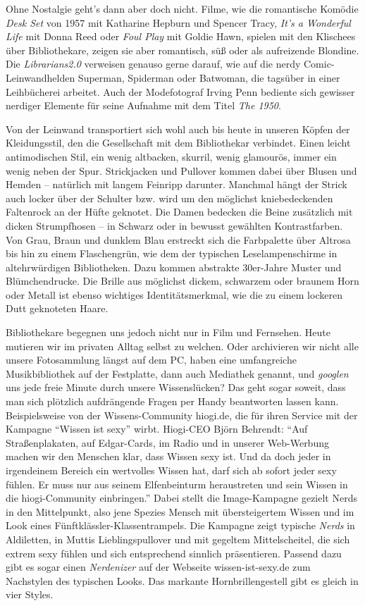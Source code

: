 \documentclass[output=paper]{langscibook}
\begin{document}
Ohne Nostalgie geht's dann aber doch nicht. Filme, wie die romantische
Komödie \emph{Desk Set} von 1957 mit Katharine Hepburn und Spencer
Tracy, \emph{It's a Wonderful Life} mit Donna Reed oder \emph{Foul Play}
mit Goldie Hawn, spielen mit den Klischees über Bibliothekare, zeigen
sie aber romantisch, süß oder als aufreizende Blondine. Die
\emph{Librarians2.0} verweisen genauso gerne darauf, wie auf die nerdy
Comic-Leinwandhelden Superman, Spiderman oder Batwoman, die tagsüber in
einer Leihbücherei arbeitet. Auch der Modefotograf Irving Penn bediente
sich gewisser nerdiger Elemente für seine Aufnahme mit dem Titel
\emph{The 1950}.

Von der Leinwand transportiert sich wohl auch bis heute in unseren
Köpfen der Kleidungsstil, den die Gesellschaft mit dem Bibliothekar
verbindet. Einen leicht antimodischen Stil, ein wenig altbacken,
skurril, wenig glamourös, immer ein wenig neben der Spur. Strickjacken
und Pullover kommen dabei über Blusen und Hemden -- natürlich mit langem
Feinripp darunter. Manchmal hängt der Strick auch locker über der
Schulter bzw. wird um den möglichst kniebedeckenden Faltenrock an der
Hüfte geknotet. Die Damen bedecken die Beine zusätzlich mit dicken
Strumpfhosen -- in Schwarz oder in bewusst gewählten Kontrastfarben. Von
Grau, Braun und dunklem Blau erstreckt sich die Farbpalette über Altrosa
bis hin zu einem Flaschengrün, wie dem der typischen Leselampenschirme
in altehrwürdigen Bibliotheken. Dazu kommen abstrakte 30er-Jahre Muster
und Blümchendrucke. Die Brille aus möglichst dickem, schwarzem oder
braunem Horn oder Metall ist ebenso wichtiges Identitätsmerkmal, wie die
zu einem lockeren Dutt geknoteten Haare.

Bibliothekare begegnen uns jedoch nicht nur in Film und Fernsehen. Heute
mutieren wir im privaten Alltag selbst zu welchen. Oder archivieren wir
nicht alle unsere Fotosammlung längst auf dem PC, haben eine
umfangreiche Musikbibliothek auf der Festplatte, dann auch Mediathek
genannt, und \emph{googlen} uns jede freie Minute durch unsere
Wissenslücken? Das geht sogar soweit, dass man sich plötzlich
aufdrängende Fragen per Handy beantworten lassen kann. Beispielsweise
von der Wissens-Community hiogi.de, die für ihren Service mit der
Kampagne ``Wissen ist sexy'' wirbt. Hiogi-CEO Björn Behrendt: ``Auf
Straßenplakaten, auf Edgar-Cards, im Radio und in unserer Web-Werbung
machen wir den Menschen klar, dass Wissen sexy ist. Und da doch jeder in
irgendeinem Bereich ein wertvolles Wissen hat, darf sich ab sofort jeder
sexy fühlen. Er muss nur aus seinem Elfenbeinturm heraustreten und sein
Wissen in die hiogi-Community einbringen.'' Dabei stellt die
Image-Kampagne gezielt Nerds in den Mittelpunkt, also jene Spezies
Mensch mit übersteigertem Wissen und im Look eines
Fünftklässler-Klassentrampels. Die Kampagne zeigt typische \emph{Nerds}
in Aldiletten, in Muttis Lieblingspullover und mit gegeltem
Mittelscheitel, die sich extrem sexy fühlen und sich entsprechend
sinnlich präsentieren. Passend dazu gibt es sogar einen
\emph{Nerdenizer} auf der Webseite wissen-ist-sexy.de zum Nachstylen des
typischen Looks. Das markante Hornbrillengestell gibt es gleich in vier
Styles.
\end{document}
